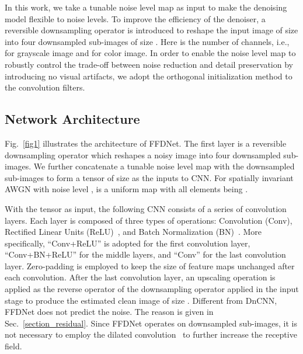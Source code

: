 \documentclass[journal]{IEEEtran}
\begin{document}
In this work, we take a tunable noise level map  as input to make the denoising model flexible to noise levels. To improve the efficiency of the denoiser, a reversible downsampling operator is introduced to reshape the input image of size  into four downsampled sub-images of size .
Here  is the number of channels, i.e.,  for grayscale image and  for color image.
In order to enable the noise level map to robustly control the trade-off between noise
reduction and detail preservation by introducing no visual artifacts, we adopt the orthogonal
initialization method to the convolution filters.



\subsection{Network Architecture}

Fig.~\ref{fig1} illustrates the architecture of FFDNet. The first layer is a reversible downsampling operator which reshapes
a noisy image  into four downsampled sub-images.
We further concatenate a tunable noise level map  with the downsampled sub-images to form a tensor  of size  as the inputs to CNN.
For spatially invariant AWGN with noise level ,  is a uniform map with all elements being .


With the tensor  as input, the following CNN consists of a series of  convolution layers.
Each layer is composed of three types of operations: Convolution (Conv), Rectified Linear Units (ReLU)~\cite{krizhevsky2012imagenet}, and Batch Normalization (BN)~\cite{ioffe2015batch}.
More specifically, ``Conv+ReLU'' is adopted for the first convolution layer, ``Conv+BN+ReLU'' for the middle layers, and ``Conv'' for the last convolution layer.
Zero-padding is employed to keep the size of feature maps unchanged after each convolution. After the last convolution layer, an upscaling operation is applied as the reverse operator of the downsampling operator applied in the input stage to produce the estimated clean image  of size .
Different from DnCNN, FFDNet does not predict the noise. The reason is given in Sec.~\ref{section_residual}.
Since FFDNet operates on downsampled sub-images, it is not necessary to employ the dilated convolution~\cite{yu2015multi} to further increase the receptive field.
\end{document}
